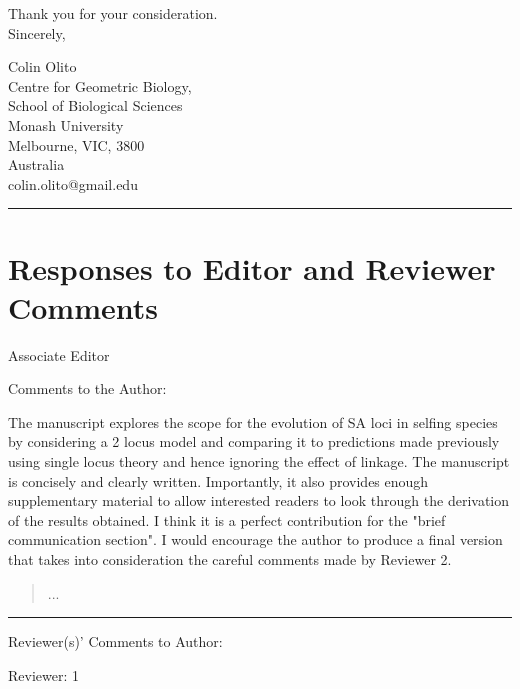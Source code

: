 \documentclass[11pt]{article}
\begin{document}
\bigskip

\noindent Thank you for your consideration. \\
\noindent Sincerely,
\bigskip

\noindent Colin Olito \\
\noindent Centre for Geometric Biology, \\
\noindent School of Biological Sciences \\
\noindent Monash University \\
\noindent Melbourne, VIC, 3800 \\
\noindent Australia \\
\noindent colin.olito@gmail.edu \\

\bigskip
\noindent \rule{\textwidth}{0.4pt}
\bigskip

\newpage{}

\section*{Responses to Editor and Reviewer Comments}


Associate Editor

\noindent Comments to the Author:
\bigskip 

The manuscript explores the scope for the evolution of SA loci in selfing species by considering a 2 locus model and comparing it to predictions made previously using single locus theory and hence ignoring the effect of linkage. The manuscript is concisely and clearly written. Importantly, it also provides enough supplementary material to allow interested readers to look through the derivation of the results obtained.  I think it is a perfect contribution for the "brief communication section". I would encourage the author to produce a final version that takes into consideration the careful comments made by Reviewer 2.

	\begin{quote}
		...
	\end{quote}

\bigskip
\noindent \rule{8cm}{0.4pt}
\bigskip

\noindent Reviewer(s)' Comments to Author:
\bigskip

\noindent Reviewer: 1
\bigskip
\end{document}
